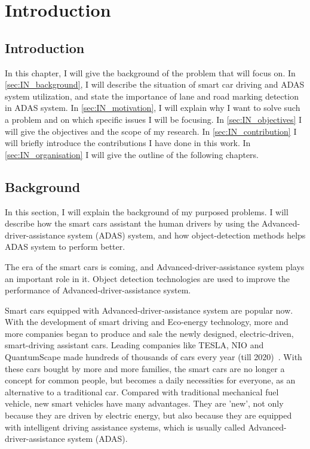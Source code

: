 
\chapter{Introduction}
\begin{spacing}{1.5}
\setlength{\parskip}{0.3in}

\section{Introduction}

In this chapter, I will give the background of the problem that will focus on. In \autoref{sec:IN_background}, I will describe the situation of smart car driving and ADAS system utilization, and state the importance of lane and road marking detection in ADAS system. In \autoref{sec:IN_motivation}, I will explain why I want to solve such a problem and on which specific issues I will be focusing. In \autoref{sec:IN_objectives} I will give the objectives and the scope of my research. In \autoref{sec:IN_contribution} I will briefly introduce the contributions I have done in this work. In \autoref{sec:IN_organisation} I will give the outline of the following chapters.

\section{Background}
\label{sec:IN_background}

In this section, I will explain the background of my purposed problems. I will describe how the smart cars assistant the human drivers by using the Advanced-driver-assistance system (ADAS) system, and how object-detection methods helps ADAS system to perform better.

The era of the smart cars is coming, and Advanced-driver-assistance system plays an important role in it. Object detection technologies are used to improve the performance of Advanced-driver-assistance system.

Smart cars equipped with Advanced-driver-assistance system are popular now. With the development of smart driving and Eco-energy technology, more and more companies began to produce and sale the newly designed, electric-driven, smart-driving assistant cars. Leading companies like TESLA, NIO and QuantumScape made hundreds of thousands of cars every year (till 2020)~\cite{petranek2015we}. With these cars bought by more and more families, the smart cars are no longer a concept for common people, but becomes a daily necessities for everyone, as an alternative to a traditional car. Compared with traditional mechanical fuel vehicle, new smart vehicles have many advantages. They are 'new', not only because they are driven by electric energy, but also because they are equipped with intelligent driving assistance systems, which is usually called Advanced-driver-assistance system (ADAS).


\end{spacing}
